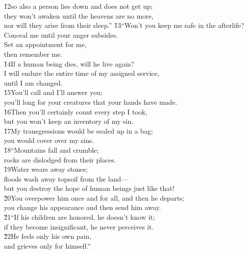 \begin{poetry}
\poeml \v{12}so also a person lies down and does not get up; \\
\poemll    they won't awaken until the heavens are no more, \\
\poemlll       nor will they arise from their sleep.''
\poeml \v{13}``Won't you keep me safe in the afterlife? \\
\poemll    Conceal me until your anger subsides. \\
\poeml Set an appointment for me, \\
\poemll    then remember me. \\
\poeml \v{14}If a human being dies, will he live again? \\
\poemll    I will endure the entire time of my assigned service, \\
\poemlll       until I am changed. \\
\poeml \v{15}You'll call and I'll answer you; \\
\poemll    you'll long for your creatures that your hands have made. \\
\poeml \v{16}Then you'll certainly count every step I took, \\
\poemll    but you won't keep an inventory of my sin. \\
\poeml \v{17}My transgressions would be sealed up in a bag; \\
\poemll    you would cover over my sins. \\
\poeml \v{18}``Mountains fall and crumble; \\
\poemll    rocks are dislodged from their places. \\
\poeml \v{19}Water wears away stones; \\
\poemll    floods wash away topsoil from the land--- \\
\poemlll       but you destroy the hope of human beings just like that! \\
\poeml \v{20}You overpower him once and for all, and then he departs; \\
\poemll    you change his appearance and then send him away. \\
\poeml \v{21}``If his children are honored, he doesn't know it; \\
\poemll    if they become insignificant, he never perceives it. \\
\poeml \v{22}He feels only his own pain, \\
\poemll    and grieves only for himself.''
\end{poetry}

